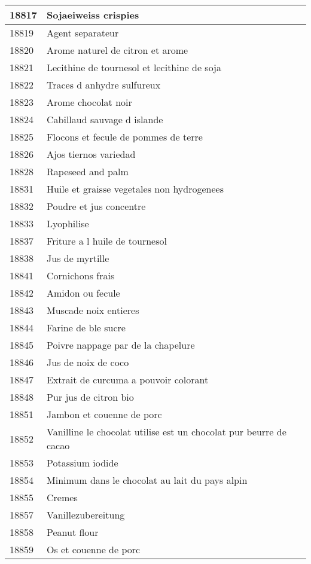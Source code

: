 \begin{longtable}{|l|l|}
18817 & Sojaeiweiss crispies \\ \hline 
18819 & Agent separateur \\ \hline 
18820 & Arome naturel de citron et arome \\ \hline 
18821 & Lecithine de tournesol et lecithine de soja \\ \hline 
18822 & Traces d anhydre sulfureux \\ \hline 
18823 & Arome chocolat noir \\ \hline 
18824 & Cabillaud sauvage d islande \\ \hline 
18825 & Flocons et fecule de pommes de terre \\ \hline 
18826 & Ajos tiernos variedad \\ \hline 
18828 & Rapeseed and palm \\ \hline 
18831 & Huile et graisse vegetales non hydrogenees \\ \hline 
18832 & Poudre et jus concentre \\ \hline 
18833 & Lyophilise \\ \hline 
18837 & Friture a l huile de tournesol \\ \hline 
18838 & Jus de myrtille \\ \hline 
18841 & Cornichons frais \\ \hline 
18842 & Amidon ou fecule \\ \hline 
18843 & Muscade noix entieres \\ \hline 
18844 & Farine de ble sucre \\ \hline 
18845 & Poivre nappage par de la chapelure \\ \hline 
18846 & Jus de noix de coco \\ \hline 
18847 & Extrait de curcuma a pouvoir colorant \\ \hline 
18848 & Pur jus de citron bio \\ \hline 
18851 & Jambon et couenne de porc \\ \hline 
18852 & Vanilline le chocolat utilise est un chocolat pur beurre de cacao \\ \hline 
18853 & Potassium iodide \\ \hline 
18854 & Minimum dans le chocolat au lait du pays alpin \\ \hline 
18855 & Cremes \\ \hline 
18857 & Vanillezubereitung \\ \hline 
18858 & Peanut flour \\ \hline 
18859 & Os et couenne de porc \\ \hline 

\end{longtable}
